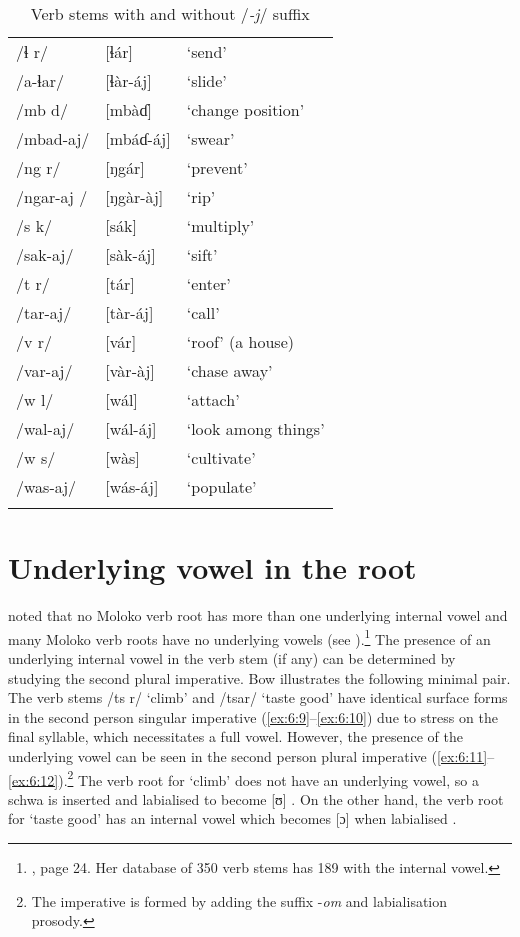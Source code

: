 \begin{table}
\begin{tabular}{lll}
/ɬ r/ & [ɬár] & ‘send’\\
/a-ɬar/ & [ɬàr-áj] & ‘slide’\\

/mb d/ & [mbàɗ] & ‘change position’\\
/mbad-aj/ & [mbáɗ-áj] & ‘swear’\\

/ng r/ & [ŋgár] & ‘prevent’\\
/ngar-aj / & [ŋgàr-àj] & ‘rip’\\

/s k/ & [sák] & ‘multiply’\\
/sak-aj/ & [sàk-áj] & ‘sift’\\

/t r/ & [tár] & ‘enter’\\
/tar-aj/ & [tàr-áj] & ‘call’\\

/v r/ & [vár] & ‘roof’ (a house)\\
/var-aj/ & [vàr-àj] & ‘chase away’\\

/w l/ & [wál] & ‘attach’\\
/wal-aj/ & [wál-áj] & ‘look among things’\\

/w s/ & [wàs] & ‘cultivate’\\
/was-aj/ & [wás-áj] & ‘populate’\\
\lspbottomrule
\end{tabular}
\caption{Verb stems with and without /\textit{-j}/ suffix\label{tab:40}}
\end{table}

\section{Underlying vowel in the root}\label{sec:6.4}
\hypertarget{RefHeading1211961525720847}{}
\largerpage \citet{Bow1997c} noted that no Moloko verb root has more than one underlying internal vowel and many Moloko verb roots have no underlying vowels (see ).\footnote{\citealt{Bow1997c}, page 24. Her database of 350 verb stems has 189 with the internal vowel.}  The presence of an underlying internal vowel in the verb stem (if any) can be determined by studying the second plural imperative. Bow illustrates the following minimal pair. The verb stems  /ts r/ ‘climb’ and /tsar/ ‘taste good’ have identical surface forms in the second person singular imperative (\ref{ex:6:9}--\ref{ex:6:10}) due to stress on the final syllable, which necessitates a full vowel. However, the presence of the underlying vowel can be seen in the second person plural imperative (\ref{ex:6:11}--\ref{ex:6:12}).\footnote{The {\twoP} imperative is formed by adding the suffix -\textit{om} and labialisation prosody.} The verb root for ‘climb’ does not have an underlying vowel, so a schwa is inserted and labialised to become [ʊ] . On the other hand, the verb root for ‘taste good’ has an internal vowel which becomes [ɔ] when labialised .

